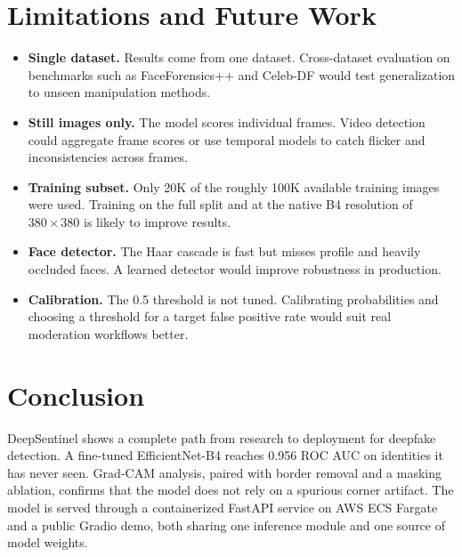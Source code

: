 \documentclass[11pt]{article}
\begin{document}
\section{Limitations and Future Work}

\begin{itemize}
  \item \textbf{Single dataset.} Results come from one dataset. Cross-dataset evaluation on benchmarks such as FaceForensics++ \cite{ffpp} and Celeb-DF \cite{celebdf} would test generalization to unseen manipulation methods.
  \item \textbf{Still images only.} The model scores individual frames. Video detection could aggregate frame scores or use temporal models to catch flicker and inconsistencies across frames.
  \item \textbf{Training subset.} Only 20K of the roughly 100K available training images were used. Training on the full split and at the native B4 resolution of $380\times380$ is likely to improve results.
  \item \textbf{Face detector.} The Haar cascade is fast but misses profile and heavily occluded faces. A learned detector would improve robustness in production.
  \item \textbf{Calibration.} The 0.5 threshold is not tuned. Calibrating probabilities and choosing a threshold for a target false positive rate would suit real moderation workflows better.
\end{itemize}

\section{Conclusion}

DeepSentinel shows a complete path from research to deployment for deepfake detection. A fine-tuned EfficientNet-B4 reaches 0.956 ROC AUC on identities it has never seen. Grad-CAM analysis, paired with border removal and a masking ablation, confirms that the model does not rely on a spurious corner artifact. The model is served through a containerized FastAPI service on AWS ECS Fargate and a public Gradio demo, both sharing one inference module and one source of model weights.
\end{document}
